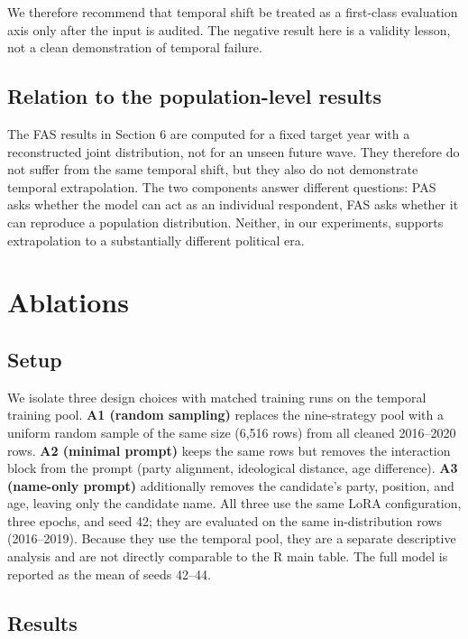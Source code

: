 We therefore recommend that temporal shift be treated as a first-class
evaluation axis only after the input is audited. The negative result
here is a validity lesson, not a clean demonstration of temporal
failure.

\subsection{Relation to the population-level
results}\label{relation-to-the-population-level-results}

The FAS results in Section 6 are computed for a fixed target year with a
reconstructed joint distribution, not for an unseen future wave. They
therefore do not suffer from the same temporal shift, but they also do
not demonstrate temporal extrapolation. The two components answer
different questions: PAS asks whether the model can act as an individual
respondent, FAS asks whether it can reproduce a population distribution.
Neither, in our experiments, supports extrapolation to a substantially
different political era.

\section{Ablations}\label{ablations}

\subsection{Setup}\label{setup-3}

We isolate three design choices with matched training runs on the
temporal training pool. \textbf{A1 (random sampling)} replaces the
nine-strategy pool with a uniform random sample of the same size (6,516
rows) from all cleaned 2016--2020 rows. \textbf{A2 (minimal prompt)}
keeps the same rows but removes the interaction block from the prompt
(party alignment, ideological distance, age difference). \textbf{A3
(name-only prompt)} additionally removes the candidate's party,
position, and age, leaving only the candidate name. All three use the
same LoRA configuration, three epochs, and seed 42; they are evaluated
on the same in-distribution rows (2016--2019). Because they use the
temporal pool, they are a separate descriptive analysis and are not
directly comparable to the R main table. The full model is reported as
the mean of seeds 42--44.

\subsection{Results}\label{results}

